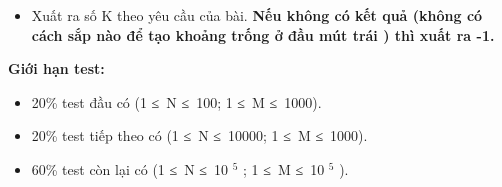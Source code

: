 \begin{itemize}
	\item     Xuất ra số K theo yêu cầu của bài.    \textbf{     Nếu không có kết quả (không có cách sắp nào để tạo khoảng trống ở đầu mút trái ) thì xuất ra -1.    }
\end{itemize}

\textbf{     Giới hạn test:    }
\begin{itemize}
	\item      20\% test đầu có (1 ≤ N ≤ 100; 1 ≤ M ≤ 1000).    
	\item      20\% test tiếp theo có           (1 ≤ N ≤ 10000; 1 ≤ M ≤ 1000).     
	\item        60\% test còn lại có (1 ≤ N ≤ 10       $^        5       $       ; 1 ≤ M ≤ 10       $^        5       $       ).      
\end{itemize}
\begin{itemize}
\end{itemize}